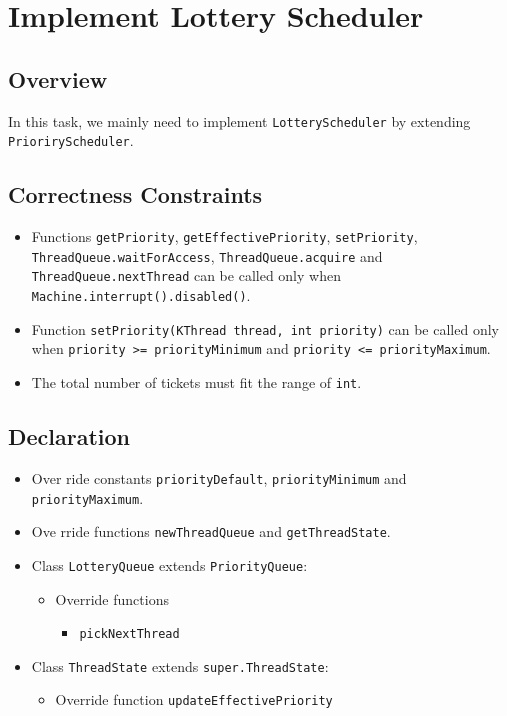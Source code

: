 \documentclass{article}
\begin{document}
\section{Implement Lottery Scheduler}
\subsection{Overview}
In this task, we mainly need to implement \texttt{LotteryScheduler} by extending \texttt{PrioriryScheduler}.
\subsection{Correctness Constraints}
\begin{itemize}
    \item
        Functions \texttt{getPriority}, \texttt{getEffectivePriority}, \texttt{setPriority},
        \texttt{ThreadQueue.waitForAccess}, \texttt{ThreadQueue.acquire} and
        \texttt{ThreadQueue.nextThread} can be called only when \texttt{Machine.interrupt().disabled()}.
    \item
        Function \texttt{setPriority(KThread thread, int priority)} can be called only when
        \texttt{priority >= priorityMinimum} and \texttt{priority <= priorityMaximum}.
    \item
        The total number of tickets must fit the range of \texttt{int}.
\end{itemize}
\subsection{Declaration}
\begin{itemize}
    \item
        Over ride constants \texttt{priorityDefault}, \texttt{priorityMinimum} and \texttt{priorityMaximum}.
    \item
        Ove rride functions \texttt{newThreadQueue} and \texttt{getThreadState}.
    \item
        Class \texttt{LotteryQueue} extends \texttt{PriorityQueue}:
        \begin{itemize}
            \item
                Override functions
                \begin{itemize}
                    \item \texttt{pickNextThread}
                \end{itemize}
        \end{itemize}
    \item
        Class \texttt{ThreadState} extends \texttt{super.ThreadState}:
        \begin{itemize}
            \item
                Override function \texttt{updateEffectivePriority}
        \end{itemize}
\end{itemize}
\end{document}
